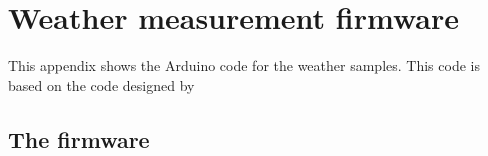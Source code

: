 \chapter{Weather measurement firmware}\label{ap:wet_code}
This appendix shows the Arduino code for the weather samples. This code is based on the code designed by \citep{how_anemometer}


\section*{The firmware}





